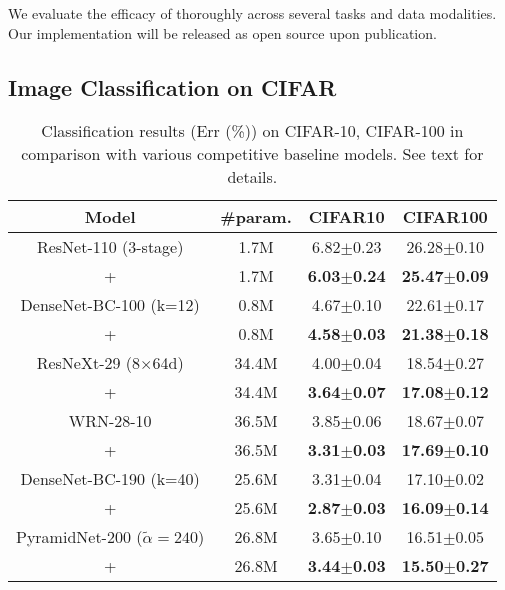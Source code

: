 \documentclass[final]{cvpr}
\begin{document}
We evaluate the efficacy of \methodname{} thoroughly across several tasks and data modalities. Our implementation will be released as open source upon publication. 


\subsection{Image Classification on CIFAR}

\begin{table}[t]
    \centering
    \footnotesize
\begin{tabular}{c|c|c|c}
\toprule
Model & \#param. & CIFAR10 & CIFAR100 \\  
\midrule\midrule
ResNet-110 (3-stage) & 1.7M &  6.82$\pm$0.23& 26.28$\pm$0.10 \\
+\methodname{} & 1.7M & \textbf{6.03$\pm$0.24}& \textbf{25.47$\pm$0.09} \\

\midrule
DenseNet-BC-100 (k=12) & 0.8M & 4.67$\pm$0.10
& 22.61$\pm0.17$   \\
+\methodname{} &0.8M&\textbf{4.58$\pm$0.03} &  \textbf{21.38$\pm$0.18}\\
\midrule
ResNeXt-29 (8$\times$64d) & 34.4M &4.00$\pm$0.04 &18.54$\pm$0.27  \\
+\methodname{} &34.4M&\textbf{3.64$\pm$0.07}&\textbf{17.08$\pm$0.12}\\
\midrule
WRN-28-10 & 36.5M &  3.85$\pm$0.06& 18.67$\pm0.07$ \\
+\methodname{} & 36.5M & \textbf{3.31$\pm$0.03} &  \textbf{17.69$\pm$0.10} \\
\midrule
DenseNet-BC-190 (k=40) & 25.6M &3.31$\pm$0.04 &17.10$\pm$0.02  \\
+\methodname{} &25.6M&\textbf{2.87$\pm$0.03}& \textbf{16.09$\pm$0.14}\\
\midrule
PyramidNet-200 ($\tilde{\alpha}=240$) & 26.8M &3.65$\pm$0.10  & 16.51$\pm0.05$ \\
+\methodname{} & 26.8M & \textbf{3.44$\pm$0.03} &  \textbf{15.50$\pm$0.27} \\
\bottomrule
\end{tabular}
\caption{
Classification results (Err (\%)) on CIFAR-10, CIFAR-100 in comparison with various competitive baseline models. See text for details.
}
\label{tab:moex_cifar100_result1}     \vspace{-0.1in}
\end{table}
\end{document}

